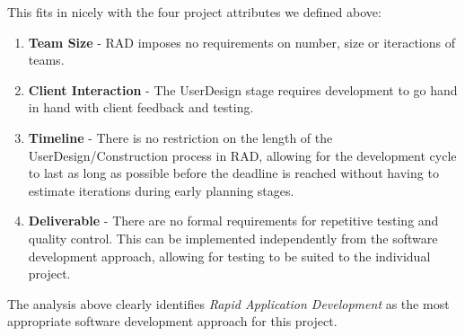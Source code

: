 \begin{itemize}
    This fits in nicely with the four project attributes we defined above:
    \begin{enumerate}
      \item \textbf{Team Size} - 
        RAD imposes no requirements on number, size or iteractions of teams.
      \item \textbf{Client Interaction} - 
        The UserDesign stage requires development to go hand in hand with client feedback and testing.
      \item \textbf{Timeline} - 
        There is no restriction on the length of the UserDesign/Construction process in RAD, allowing for the development cycle to last as long as possible before the deadline is reached without having to estimate iterations during early planning stages.
      \item \textbf{Deliverable} - 
        There are no formal requirements for repetitive testing and quality control. This can be implemented independently from the software development approach, allowing for testing to be suited to the individual project.
    \end{enumerate}
\end{itemize}
The analysis above clearly identifies \emph{Rapid Application Development} as the most appropriate software development approach for this project.